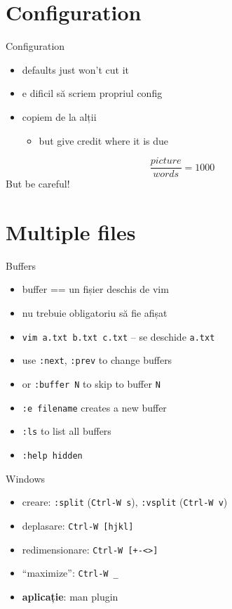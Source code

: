 \documentclass{beamer}
\begin{document}
\section{Configuration}
\begin{frame}{Configuration}
  \begin{itemize}
    \item defaults just won't cut it
    \item e dificil să scriem propriul config
    \item copiem de la alții
    \pause
    \begin{itemize}
      \item but give credit where it is due
    \end{itemize}
  \end{itemize}
  \pause
  $$ \frac{picture}{words} = 1000 $$
  \pause
But be careful!
\end{frame}

\section{Multiple files}

\begin{frame}{Buffers}
  \begin{itemize}
    \item buffer == un fișier deschis de vim
    \item nu trebuie obligatoriu să fie afișat
    \item \texttt{vim a.txt b.txt c.txt} -- se deschide \texttt{a.txt}
    \item use \texttt{:next}, \texttt{:prev} to change buffers
    \item or \texttt{:buffer N} to skip to buffer \texttt{N}
    \item \texttt{:e filename} creates a new buffer
    \item \texttt{:ls} to list all buffers
    \item \texttt{:help hidden}
  \end{itemize}
\end{frame}

\begin{frame}{Windows}
  \begin{itemize}
    \item creare: \texttt{:split} (\texttt{Ctrl-W s}), \texttt{:vsplit}
    (\texttt{Ctrl-W v})
    \item deplasare: \texttt{Ctrl-W [hjkl]}
    \item redimensionare: \texttt{Ctrl-W [+-<>]}
    \item ``maximize'': \texttt{Ctrl-W \_}
    \pause
    \item \textbf{aplicație}: man plugin
  \end{itemize}
\end{frame}
\end{document}
